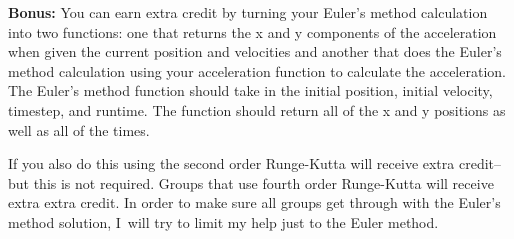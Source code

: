\documentclass{book}
\begin{document}
{\small {\bf Bonus:}  You can earn extra credit by turning your Euler's method calculation into two functions: one that returns the x and y components of the acceleration when given the current position and velocities and another that does the Euler's method calculation using your acceleration function to calculate the acceleration.  The Euler's method function should take in the initial position, initial velocity, timestep, and runtime.  The function should return all of the x and y positions as well as all of the times.

If you also do this using the second order Runge-Kutta will receive
extra credit--but this is not required. Groups that use fourth order
Runge-Kutta will receive extra extra credit. In order to make sure all groups
get through with the Euler's method solution, I\ will try to limit my help
just to the Euler method. }
\end{document}
